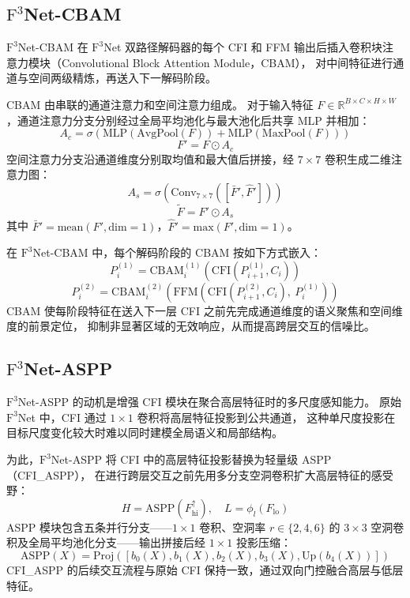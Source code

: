 \documentclass[UTF8,a4paper,10pt]{ctexart}
\begin{document}
\subsection{$\text{F}^3$Net-CBAM}

$\text{F}^3$Net-CBAM 在 $\text{F}^3$Net 双路径解码器的每个 CFI 和 FFM 输出后插入卷积块注意力模块（Convolutional Block Attention Module，CBAM），
对中间特征进行通道与空间两级精炼，再送入下一解码阶段。

CBAM 由串联的通道注意力和空间注意力组成。
对于输入特征 $F \in \mathbb{R}^{B \times C \times H \times W}$，通道注意力分支分别经过全局平均池化与最大池化后共享 MLP 并相加：
\[
A_c = \sigma\!\left(\text{MLP}(\text{AvgPool}(F)) + \text{MLP}(\text{MaxPool}(F))\right)
\]
\[
F' = F \odot A_c
\]
空间注意力分支沿通道维度分别取均值和最大值后拼接，经 $7\times7$ 卷积生成二维注意力图：
\[
A_s = \sigma\!\left(\text{Conv}_{7\times7}\!\left([\bar{F}', \hat{F}']\right)\right)
\]
\[
\tilde{F} = F' \odot A_s
\]
其中 $\bar{F}' = \text{mean}(F', \text{dim}=1)$，$\hat{F}' = \text{max}(F', \text{dim}=1)$。

在 $\text{F}^3$Net-CBAM 中，每个解码阶段的 CBAM 按如下方式嵌入：
\[
P_i^{(1)} = \text{CBAM}_i^{(1)}\!\left(\text{CFI}(P_{i+1}^{(1)}, C_i)\right)
\]
\[
P_i^{(2)} = \text{CBAM}_i^{(2)}\!\left(\text{FFM}\!\left(\text{CFI}(P_{i+1}^{(2)}, C_i),\ P_i^{(1)}\right)\right)
\]
CBAM 使每阶段特征在送入下一层 CFI 之前先完成通道维度的语义聚焦和空间维度的前景定位，
抑制非显著区域的无效响应，从而提高跨层交互的信噪比。

\subsection{$\text{F}^3$Net-ASPP}

$\text{F}^3$Net-ASPP 的动机是增强 CFI 模块在聚合高层特征时的多尺度感知能力。
原始 $\text{F}^3$Net 中，CFI 通过 $1\times1$ 卷积将高层特征投影到公共通道，
这种单尺度投影在目标尺度变化较大时难以同时建模全局语义和局部结构。

为此，$\text{F}^3$Net-ASPP 将 CFI 中的高层特征投影替换为轻量级 ASPP（CFI\_ASPP），
在进行跨层交互之前先用多分支空洞卷积扩大高层特征的感受野：
\[
H = \text{ASPP}(F_{\text{hi}}^{\uparrow}), \quad L = \phi_l(F_{\text{lo}})
\]
ASPP 模块包含五条并行分支——$1\times1$ 卷积、空洞率 $r\in\{2,4,6\}$ 的 $3\times3$ 空洞卷积及全局平均池化分支——输出拼接后经 $1\times1$ 投影压缩：
\[
\text{ASPP}(X) = \text{Proj}\!\left(\left[b_0(X), b_1(X), b_2(X), b_3(X), \text{Up}(b_4(X))\right]\right)
\]
CFI\_ASPP 的后续交互流程与原始 CFI 保持一致，通过双向门控融合高层与低层特征。
\end{document}
